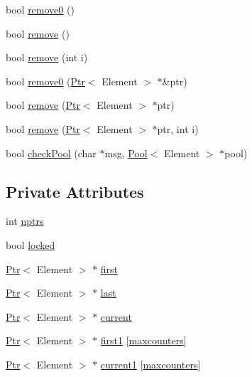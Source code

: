 \begin{CompactItemize}
\item 
bool \hyperlink{classContainer_07700ba69cf69ce61c7dad863f41a69b}{remove0} ()
\item 
bool \hyperlink{classContainer_0ea8bb3267b6bef9959ea744bc9b36ea}{remove} ()
\item 
bool \hyperlink{classContainer_b79f3ed8a43ab371b9b1463b0d3da75f}{remove} (int i)
\item 
bool \hyperlink{classContainer_edd72c6884155667dc637694abd3babc}{remove0} (\hyperlink{structPtr}{Ptr}$<$ Element $>$ $\ast$\&ptr)
\item 
bool \hyperlink{classContainer_1eb390532eb41c1029ad93fec035be1c}{remove} (\hyperlink{structPtr}{Ptr}$<$ Element $>$ $\ast$ptr)
\item 
bool \hyperlink{classContainer_58948a285c21989742bd9a3c92266cae}{remove} (\hyperlink{structPtr}{Ptr}$<$ Element $>$ $\ast$ptr, int i)
\item 
bool \hyperlink{classContainer_1509fb216b609a2b938cc42fe25502ec}{checkPool} (char $\ast$msg, \hyperlink{structPool}{Pool}$<$ Element $>$ $\ast$pool)
\end{CompactItemize}
\subsection*{Private Attributes}
\begin{CompactItemize}
\item 
int \hyperlink{classContainer_c74449cb853bdac133c53404726a1e48}{nptrs}
\item 
bool \hyperlink{classContainer_9f3916a0a0d1ae6385f32feac3d34e19}{locked}
\item 
\hyperlink{structPtr}{Ptr}$<$ Element $>$ $\ast$ \hyperlink{classContainer_1b3e7c09fde6b124308eb6c47601e9d3}{first}
\item 
\hyperlink{structPtr}{Ptr}$<$ Element $>$ $\ast$ \hyperlink{classContainer_f47de54dbd8b37934f0ead4fa7b2a93c}{last}
\item 
\hyperlink{structPtr}{Ptr}$<$ Element $>$ $\ast$ \hyperlink{classContainer_c9071a45e026493a71943b7ffa747282}{current}
\item 
\hyperlink{structPtr}{Ptr}$<$ Element $>$ $\ast$ \hyperlink{classContainer_17576ca73c7bfc3681c0783bd880f866}{first1} \mbox{[}\hyperlink{def_8h_70cd7898027f297d8d8d478b87f896d2}{maxcounters}\mbox{]}
\item 
\hyperlink{structPtr}{Ptr}$<$ Element $>$ $\ast$ \hyperlink{classContainer_32042ccd45f4de7143ab4ba2a719452c}{current1} \mbox{[}\hyperlink{def_8h_70cd7898027f297d8d8d478b87f896d2}{maxcounters}\mbox{]}
\end{CompactItemize}


